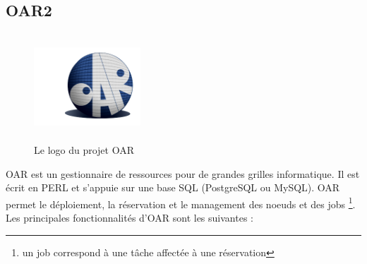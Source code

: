 \documentclass[a4paper, 10pt, onecolumn]{report}
\begin{document}
		\subsection{OAR2}	
		\begin{figure}[!h]
			\centering
   			\includegraphics[width=4cm,height=4cm]{oar_logo.png}
   			\caption{Le logo du projet OAR}
    		\label{fig:oar}
		\end{figure} 		
			OAR est un gestionnaire de ressources pour de grandes grilles informatique. Il est écrit en PERL et s'appuie sur une base SQL (PostgreSQL ou MySQL). OAR permet le déploiement, la réservation  et le management des noeuds et des jobs \footnote{un job correspond à une t\^ache affectée à une réservation}.\\
			Les principales fonctionnalités d'OAR sont les suivantes :  \\
\end{document}

